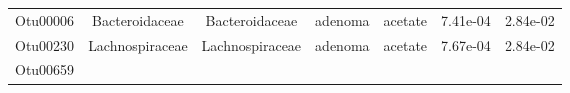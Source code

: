 \documentclass[11pt,]{article}
\begin{document}
\begin{longtable}[]{@{}ccccccc@{}}
\begin{minipage}[t]{0.09\columnwidth}\centering\strut
Otu00006\strut
\end{minipage} & \begin{minipage}[t]{0.17\columnwidth}\centering\strut
Bacteroidaceae\strut
\end{minipage} & \begin{minipage}[t]{0.17\columnwidth}\centering\strut
Bacteroidaceae\strut
\end{minipage} & \begin{minipage}[t]{0.09\columnwidth}\centering\strut
adenoma\strut
\end{minipage} & \begin{minipage}[t]{0.11\columnwidth}\centering\strut
acetate\strut
\end{minipage} & \begin{minipage}[t]{0.09\columnwidth}\centering\strut
7.41e-04\strut
\end{minipage} & \begin{minipage}[t]{0.09\columnwidth}\centering\strut
2.84e-02\strut
\end{minipage}\tabularnewline
\begin{minipage}[t]{0.09\columnwidth}\centering\strut
Otu00230\strut
\end{minipage} & \begin{minipage}[t]{0.17\columnwidth}\centering\strut
Lachnospiraceae\strut
\end{minipage} & \begin{minipage}[t]{0.17\columnwidth}\centering\strut
Lachnospiraceae\strut
\end{minipage} & \begin{minipage}[t]{0.09\columnwidth}\centering\strut
adenoma\strut
\end{minipage} & \begin{minipage}[t]{0.11\columnwidth}\centering\strut
acetate\strut
\end{minipage} & \begin{minipage}[t]{0.09\columnwidth}\centering\strut
7.67e-04\strut
\end{minipage} & \begin{minipage}[t]{0.09\columnwidth}\centering\strut
2.84e-02\strut
\end{minipage}\tabularnewline
\begin{minipage}[t]{0.09\columnwidth}\centering\strut
Otu00659\strut
\end{minipage} & \begin{minipage}[t]{0.17\columnwidth}\centering\strut

\end{minipage}
\end{longtable}
\end{document}

